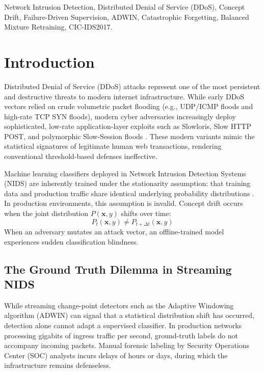 \documentclass[conference]{IEEEtran}
\begin{document}
\begin{IEEEkeywords}
Network Intrusion Detection, Distributed Denial of Service (DDoS), Concept Drift, Failure-Driven Supervision, ADWIN, Catastrophic Forgetting, Balanced Mixture Retraining, CIC-IDS2017.
\end{IEEEkeywords}

\section{Introduction}
Distributed Denial of Service (DDoS) attacks represent one of the most persistent and destructive threats to modern internet infrastructure. While early DDoS vectors relied on crude volumetric packet flooding (e.g., UDP/ICMP floods and high-rate TCP SYN floods), modern cyber adversaries increasingly deploy sophisticated, low-rate application-layer exploits such as Slowloris, Slow HTTP POST, and polymorphic Slow-Session floods \cite{sharafaldin2018}. These modern variants mimic the statistical signatures of legitimate human web transactions, rendering conventional threshold-based defenses ineffective.

Machine learning classifiers deployed in Network Intrusion Detection Systems (NIDS) are inherently trained under the stationarity assumption: that training data and production traffic share identical underlying probability distributions \cite{gama2014}. In production environments, this assumption is invalid. Concept drift occurs when the joint distribution $P(\mathbf{x}, y)$ shifts over time:
\begin{equation}
P_t(\mathbf{x}, y) \neq P_{t+\Delta t}(\mathbf{x}, y)
\end{equation}
When an adversary mutates an attack vector, an offline-trained model experiences sudden classification blindness. 

\subsection{The Ground Truth Dilemma in Streaming NIDS}
While streaming change-point detectors such as the Adaptive Windowing algorithm (ADWIN) \cite{bifet2007} can signal that a statistical distribution shift has occurred, detection alone cannot adapt a supervised classifier. In production networks processing gigabits of ingress traffic per second, ground-truth labels do not accompany incoming packets. Manual forensic labeling by Security Operations Center (SOC) analysts incurs delays of hours or days, during which the infrastructure remains defenseless.
\end{document}
